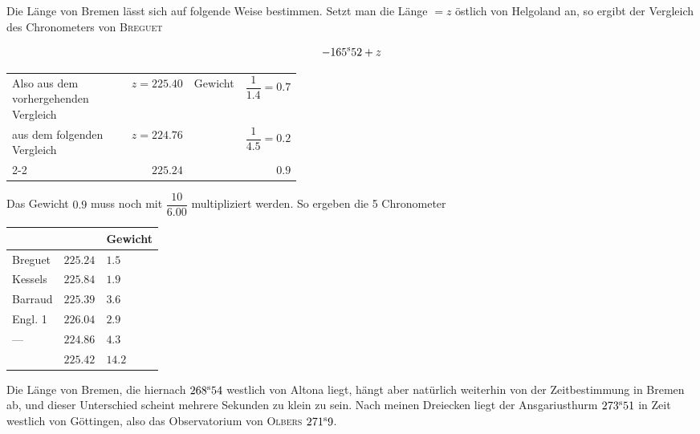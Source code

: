 Die Länge von Bremen lässt sich auf folgende Weise bestimmen. Setzt man die Länge $=z$ östlich von Helgoland an, so ergibt der Vergleich des Chronometers von \textsc{Breguet}

\[
-165^{\rm s}52+z
\]


\begin{center}\small
\begin{tabular}{p{0.42\linewidth} r l r}
Also aus dem vorhergehenden Vergleich & $z=225.40$ & Gewicht & $\dfrac{1}{1.4}=0.7$ \\[5pt]
aus dem folgenden Vergleich & $z=224.76$ & & $\dfrac{1}{4.5}=0.2$ \\[8pt]
\cline{2-2}\cline{4-4}
 & $225.24$ & & $0.9$ \\
\end{tabular}
\end{center}

Das Gewicht $0.9$ muss noch mit $\dfrac{10}{6.00}$ multipliziert werden. So ergeben die 5 Chronometer

\begin{center}
\begin{tabular}{l|l|l}
 & & Gewicht \\
\hline
Breguet & $225.24$ & $1.5$ \\
Kessels & $225.84$ & $1.9$ \\
Barraud & $225.39$ & $3.6$ \\
Engl. 1 & $226.04$ & $2.9$ \\
---\quad 4 & $224.86$ & $4.3$ \\
\hline
 & $225.42$ & $14.2$ \\
\end{tabular}
\end{center}

Die Länge von Bremen, die hiernach $268^{\rm s}54$ westlich von Altona liegt, hängt aber natürlich weiterhin von der Zeitbestimmung in Bremen ab, und dieser Unterschied scheint mehrere Sekunden zu klein zu sein. Nach meinen Dreiecken liegt der Ansgariusthurm $273^{\rm s}51$ in Zeit westlich von Göttingen, also das Observatorium von \textsc{Olbers} $271^{\rm s}9$.
